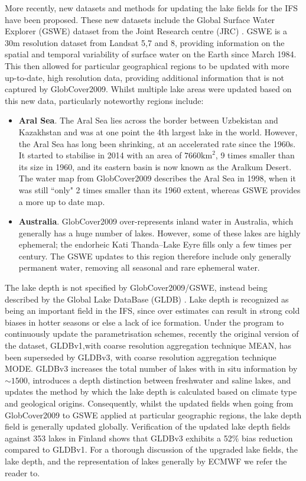 \documentclass[twocolumn]{article}
\begin{document}
\noindent More recently, new datasets and methods for updating the lake fields for the IFS have been proposed\cite{Choulga2019}. These new datasets include the Global Surface Water Explorer (GSWE) dataset from the Joint Research centre (JRC) \cite{GSWE}. GSWE is a 30m resolution dataset from Landsat 5,7 and 8, providing  information on the spatial and temporal variability of surface water on the Earth since March 1984. This then allowed for particular geographical regions to be updated with more up-to-date, high resolution data, providing additional information that is not captured by GlobCover2009. Whilst multiple lake areas were updated based on this new data, particularly noteworthy regions include:
\begin{itemize}
	\item \textbf{Aral Sea}. The Aral Sea lies across the border between Uzbekistan and Kazakhstan and was at one point the 4th largest lake in the world. However, the Aral Sea has long been shrinking, at an accelerated rate since the 1960s. It started to stabilise in 2014 with an area of $7660 \text{km}^2$, 9 times smaller than its size in 1960, and its eastern basin is now known as the Aralkum Desert. The water map from GlobCover2009 describes the Aral Sea in 1998, when it was still ``only" 2 times smaller than its 1960 extent, whereas GSWE provides a more up to date map.
	\item \textbf{Australia}. GlobCover2009 over-represents inland water in Australia, which generally has a huge number of lakes. However, some of these lakes are highly ephemeral;  the endorheic Kati Thanda–Lake Eyre fills only a few times per century. The GSWE updates to this region therefore include only generally permanent water, removing all seasonal and rare ephemeral water. 
\end{itemize} 
The lake depth is not specified by GlobCover2009/GSWE, instead being described by the Global Lake DataBase (GLDB) \cite{Kourzeneva2012}. Lake depth is recognized as being an important field in the IFS, since over estimates can result in strong cold biases in hotter seasons or else a lack of ice formation. Under the program to continuously update the parametrisation schemes, recently the original version of the dataset, GLDBv1,with coarse resolution aggregation technique MEAN, has been superseded by GLDBv3\cite{Choulga2014}, with coarse resolution aggregation technique MODE. GLDBv3 increases the total number of lakes with in situ information by $\sim1500$, introduces a depth distinction between freshwater and saline lakes, and updates the method by which the lake depth is calculated based on climate type and geological origins. Consequently, whilst the updated fields when going from GlobCover2009 to GSWE applied at particular geographic regions, the lake depth field is generally updated globally. Verification of the updated lake depth fields against 353 lakes in Finland shows that GLDBv3 exhibits a 52$\%$ bias reduction compared to GLDBv1\cite{Choulga2019}. For a thorough discussion of the upgraded lake fields, the lake depth, and the representation of lakes generally by ECMWF we refer the reader to\cite{Choulga2019,Boussetta2021}. \newline 
\end{document}
